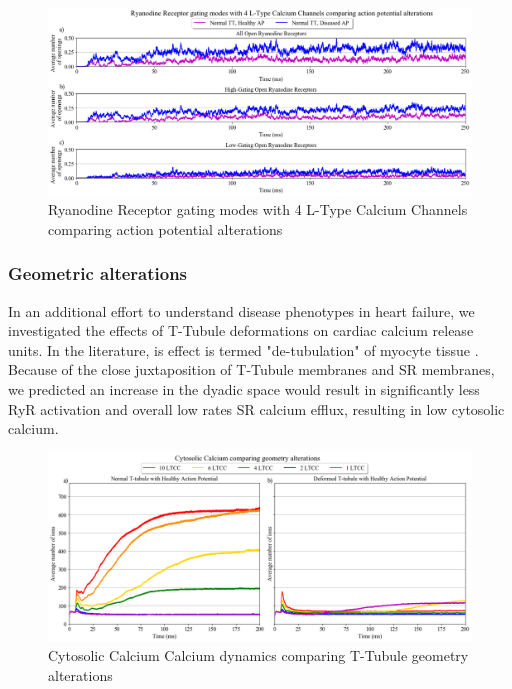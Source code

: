 \documentclass[12pt]{ucsddissertation}
\begin{document}
\setcounter{figure}{12}
\begin{figure}
\centering
	\includegraphics[scale=0.4]{hnhd4RyR_r_Comparison.png}
	\caption{Ryanodine Receptor gating modes with 4 L-Type Calcium Channels comparing action potential alterations}
\label{fig:hnhd 4 LTCC 1 AP RyR} 
\end{figure}



\subsubsection{Geometric alterations}
In an additional effort to understand disease phenotypes in heart failure, we investigated the effects of T-Tubule deformations on cardiac calcium release units. In the literature, is effect is termed "de-tubulation" of myocyte tissue \cite{Louch2010}. Because of the close juxtaposition of T-Tubule membranes and SR membranes, we predicted an increase in the dyadic space would result in significantly less RyR activation and overall low rates SR calcium efflux, resulting in low cytosolic calcium. 

\setcounter{figure}{12}
\begin{figure}
\centering
	\includegraphics[scale=0.4]{cytCa_hndn_Comparison.png}
		\caption{Cytosolic Calcium Calcium dynamics comparing T-Tubule geometry alterations}
\label{fig:geometry comparison} 
\end{figure}
\end{document}
